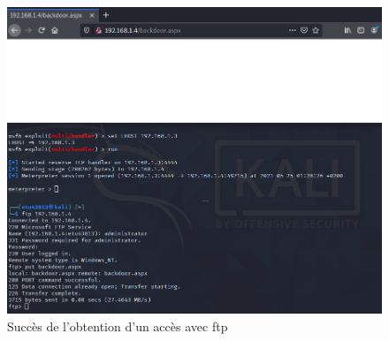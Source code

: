 \documentclass[a4paper]{article}
\begin{document}
\begin{enumerate}
\begin{example}
    \end{example}
    \begin{figure}[H]
        \centering
        \includegraphics[width=0.95\linewidth]{images/success-ftp-windows.PNG}
        \caption{Succès de l'obtention d'un accès avec ftp}
        \label{fig:ftpSuccess}
    \end{figure}
\end{enumerate}





\newpage
\end{document}
